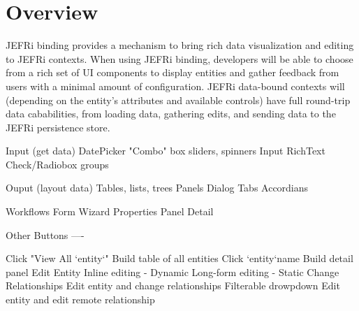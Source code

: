 \documentclass{article}
\begin{document}
\maketitle
\tableofcontents
\newpage

\section{Overview}
JEFRi binding provides a mechanism to bring rich data visualization and editing
to JEFRi contexts. When using JEFRi binding, developers will be able to choose
from a rich set of UI components to display entities and gather feedback from
users with a minimal amount of configuration. JEFRi data-bound contexts will
(depending on the entity's attributes and available controls) have full
round-trip data cababilities, from loading data, gathering edits, and sending
data to the JEFRi persistence store.


Input (get data)
	DatePicker
	"Combo" box
	sliders, spinners
	Input
	RichText
	Check/Radiobox groups

Ouput (layout data)
	Tables, lists, trees
	Panels
		Dialog
		Tabs
		Accordians

Workflows
	Form
	Wizard
	Properties Panel
	Detail

Other
	Buttons
----

Click "View All `entity`"
	Build table of all entities
Click `entity`name
	Build detail panel
Edit Entity
	Inline editing - Dynamic
	Long-form editing - Static
Change Relationships
	Edit entity and change relationships
		Filterable drowpdown
	Edit entity and edit remote relationship
\end{document}

